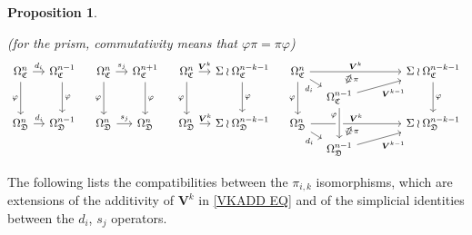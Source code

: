 \documentclass[a4paper,10pt
,draft
]{article}%
\numberwithin{equation}{section}
\numberwithin{figure}{section}
\newtheorem{proposition}[equation]{Proposition}%
\theoremstyle{definition} %
\newcommand{\1}{\ensuremath{\mathbbm 1}}%
\begin{document}
\begin{proposition}
\begin{enumerate}[label = (\roman*)]
		(for the prism, commutativity means that
		$\varphi \pi = \pi \varphi$)
		\[
		\begin{tikzcd}[column sep = 10pt, row sep = 4pt]
		\Omega^n_{\mathfrak{C}} \ar{r}{d_i} \ar{dd}[swap]{\varphi} &
		\Omega^{n-1}_{\mathfrak{C}} \ar{dd}{\varphi}
		&
		\Omega^n_{\mathfrak{C}} \ar{r}{s_j} \ar{dd}[swap]{\varphi} &
		\Omega^{n+1}_{\mathfrak{C}} \ar{dd}{\varphi}
		&
		\Omega^n_{\mathfrak{C}} \ar{r}{\boldsymbol{V}^k} \ar{dd}[swap]{\varphi} &
		\Sigma \wr \Omega^{n-k-1}_{\mathfrak{C}} \ar{dd}{\varphi}
		&
		\Omega^n_{\mathfrak{C}}
		\ar{rrrrr}[name=toE]{\boldsymbol{V}^k} \ar{rd}[swap]{d_i} \ar{dd}[swap]{\varphi}
		&&&
		&&
		\Sigma \wr \Omega^{n-k-1}_{\mathfrak{C}} \ar{dd}{\varphi}
		\\
		&
		&
		&
		&
		&
		&
		&
		|[alias=DBE]|
		\Omega^{n-1}_{\mathfrak{C}} \ar{rrrru}[swap]{\boldsymbol{V}^{k-1}}
		\\
		\Omega^n_{\mathfrak{D}} \ar{r}{d_i} &
		\Omega^{n-1}_{\mathfrak{D}}
		&
		\Omega^n_{\mathfrak{D}} \ar{r}{s_j} &
		\Omega^n_{\mathfrak{D}}
		&
		\Omega^n_{\mathfrak{D}} \ar{r}{\boldsymbol{V}^k} &
		\Sigma \wr \Omega^{n-k-1}_{\mathfrak{D}}
		&
		\Omega^n_{\mathfrak{D}} \ar{rrrrr}[name=toB]{\boldsymbol{V}^k} \ar{rd}[swap]{d_i}
		&&&
		&&
		\Sigma \wr \Omega^{n-k-1}_{\mathfrak{D}}
		\\
		&
		&
		&
		&
		&
		&
		&
		|[alias=D]| \Omega^{n-1}_{\mathfrak{D}} \ar{rrrru}[swap]{\boldsymbol{V}^{k-1}}
		\arrow[Leftrightarrow, from=DBE, to=toE, shorten <=0.1cm,shorten >=0.1cm
		,swap,near end,"\pi"
		]
		\arrow[Leftrightarrow, from=D, to=toB, shorten <=0.1cm,shorten >=0.1cm,swap,near end,"\pi"]
		\arrow[from=DBE, to=D, crossing over, near start, swap, "\varphi"]
		\end{tikzcd}
		\]
	\end{enumerate}
\end{proposition}


The following lists the compatibilities between the $\pi_{i,k}$ isomorphisms, 
which are extensions of the additivity of $\boldsymbol{V}^k$ in \eqref{VKADD EQ} and of the simplicial identities between the $d_i$, $s_j$ operators.
\end{document}
